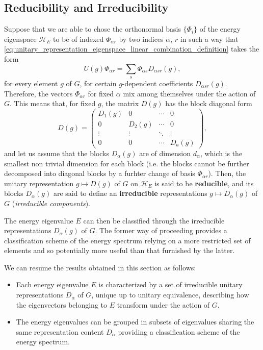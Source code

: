 \subsection{Reducibility and Irreducibility}

Suppose that we are able to chose the orthonormal basis \(\{\Phi_i\}\) of the energy eigenspace \(\mathcal{H}_E\) to be of indexed \(\Phi_{\alpha r}\) by two indices \(\alpha\), \(r\) in such a way that \eqref{eq:unitary_representation_eigenspace_linear_combination_definition} takes the form
\[
    U(g) \Phi_{\alpha r} = \sum_{s} \Phi_{\alpha s} D_{\alpha s r}(g),
\]
for every element \(g\) of \(G\), for certain \(g\)-dependent coefficients \(D_{\alpha s r}(g)\). Therefore, the vectors \(\Phi_{\alpha r}\) for fixed \(\alpha\) mix among themselves under the action of \(G\). This means that, for fixed \(g\), the matrix \(D(g)\) has the block diagonal form
\[
    D(g) = \begin{pmatrix}
        D_1(g) & 0      & \cdots & 0      \\
        0      & D_2(g) & \cdots & 0      \\
        \vdots & \vdots & \ddots & \vdots \\
        0      & 0      & \cdots & D_a(g)
    \end{pmatrix},
\]
and let us assume that the blocks \(D_{\alpha}(g)\) are of dimension \(d_{\alpha}\), which is the smallest non trivial dimension for each block (i.e. the blocks cannot be further decomposed into diagonal blocks by a furhter change of basis \(\Phi_{\alpha r}\)). Then, the unitary representation \(g \mapsto D(g)\) of \(G\) on \(\mathcal{H}_E\) is said to be \textbf{reducible}, and its blocks \(D_{\alpha}(g)\) are said to define an \textbf{irreducible} representations \(g \mapsto D_{\alpha}(g)\) of \(G\) (\textit{irreducible components}).

The energy eigenvalue \(E\) can then be classified through the irreducible representations \(D_{\alpha}(g)\) of \(G\). The former way of proceeding provides a classification scheme of the energy spectrum relying on a more restricted set of elements and so potentially more useful than that furnished by the latter.

We can resume the results obtained in this section as follows:
\begin{itemize}
    \item Each energy eigenvalue \(E\) is characterized by a set of irreducible unitary representations \(D_{\alpha}\) of \(G\), unique up to unitary equivalence, describing how the eigenvectors belonging to \(E\) transform under the action of \(G\).
    \item The energy eigenvalues can be grouped in subsets of eigenvalues sharing the same representation content \(D_{\alpha}\) providing a classification scheme of the energy spectrum.
\end{itemize}


